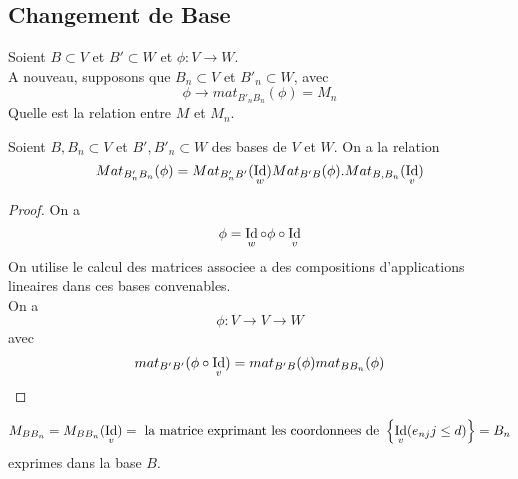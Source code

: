 \documentclass[../main.tex]{subfiles}
\begin{document}
\subsection{Changement de Base}

Soient $B\subset V$ et $B'\subset W$ et $\phi: V \to W$.\\
A nouveau, supposons que $B_n\subset V$ et $B'_n\subset W$, avec
\[ 
	\phi \to mat_{B'_nB_n} ( \phi) = M_n
\]
Quelle est la relation entre $M$ et $M_n$.
\begin{propo}
	Soient $B,B_n\subset V$ et $B',B'_n\subset W$ des bases de $V$ et $W$. On a la relation
	\[ 
		Mat_{B'_nB_n} ( \phi) = Mat_{B'_nB'}(\operatorname*{Id}_w) Mat_{B'B} ( \phi).Mat_{B,B_n} ( \operatorname*{Id}_v) 
	\]
	

\end{propo}

\begin{proof}
On a 
\[ 
\phi= \operatorname*{Id}_w \circ\phi\circ\operatorname*{Id}_v
\]
On utilise le calcul des matrices associee a des compositions d'applications lineaires dans ces bases convenables.\\
On a
\[ 
\phi: V \to V \to W
\]
avec
\[ 
	mat_{B'B'} ( \phi\circ \operatorname*{Id}_v) = mat_{B'B} ( \phi) mat_{BB_n } ( \phi) 
\]

\end{proof}
\begin{defn}
	\[ 
		M_{BB_n} = M_{BB_n} ( \operatorname*{Id}_v) = \text{ la matrice exprimant les coordonnees de  } \left\{ \operatorname*{Id}_v( e_{nj} j\leq d)  \right\} = B_n
	\]
	exprimes dans la base $B$.

\end{defn}
\end{document}
